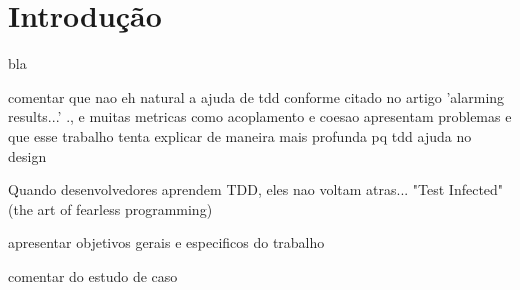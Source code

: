 \chapter{Introdução}
\label{cap:tdd-introducao}

bla

comentar que nao eh natural a ajuda de tdd conforme citado no artigo 'alarming results...' ., e muitas metricas como
acoplamento e coesao apresentam problemas
e que esse
trabalho tenta explicar de maneira mais profunda pq tdd ajuda no design

Quando desenvolvedores aprendem TDD, eles nao voltam atras... "Test Infected" (the art of fearless programming)

apresentar objetivos gerais e especificos do trabalho

comentar do estudo de caso